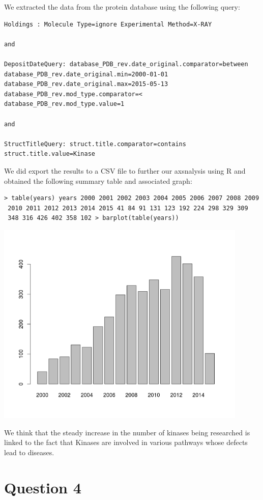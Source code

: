 \documentclass[11pt, a4paper,titlepage]{article}
\begin{document}
We extracted the data from the protein database using the following query:

\begin{verbatim}
Holdings : Molecule Type=ignore Experimental Method=X-RAY 

and 

DepositDateQuery: database_PDB_rev.date_original.comparator=between 
database_PDB_rev.date_original.min=2000-01-01 database_PDB_rev.date_original.max=2015-05-13 
database_PDB_rev.mod_type.comparator=< database_PDB_rev.mod_type.value=1 

and 

StructTitleQuery: struct.title.comparator=contains struct.title.value=Kinase
\end{verbatim}

We did export the results to a CSV file to further our axsnalysis using
R and obtained the following summary table and associated graph:

\begin{verbatim}
> table(years) years 2000 2001 2002 2003 2004 2005 2006 2007 2008 2009
 2010 2011 2012 2013 2014 2015 41 84 91 131 123 192 224 298 329 309
 348 316 426 402 358 102 > barplot(table(years))
\end{verbatim}

\includegraphics[width=12cm]{./Figures/pdb_kinases_growth.png}

We think that the steady increase in the number of kinases being
researched is linked to the fact that Kinases are involved in various
pathways whose defects lead to diseases. 

\section{Question 4}
\end{document}
